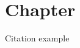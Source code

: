 \documentclass[main.tex]{subfiles}
\begin{document}
\chapter{Chapter}

Citation example\cite{latex} %

\onlyinsubfile{
  \printbibliography{}
}
\end{document}
